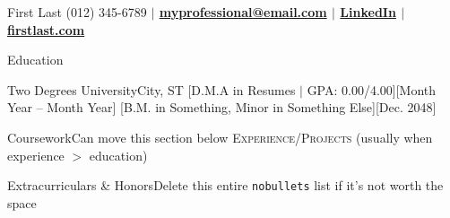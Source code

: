 \documentclass[9pt]{extarticle} %
\begin{document}
\lrHeader
{First Last}
{(012) 345-6789 \textbf{
        $\vert$ \href{mailto:myprofessional@email.com}{myprofessional@email.com}
        $\vert$ \href{https://www.linkedin.com/in/firstlast/}{LinkedIn}
        $\vert$ \href{https://www.youtube.com/watch?v=dQw4w9WgXcQ}{firstlast.com}}}

\begin{sectionList}{Education}
    \item \lr
    {Two Degrees University}{City, ST}
    [D.M.A in Resumes $\vert$ GPA: 0.00/4.00][Month Year -- Month Year]
    [B.M. in Something, Minor in Something Else][Dec. 2048]
    \begin{nobullets}
        \item {}
        {Coursework}{Can move this section below \textsc{Experience/Projects} (usually when experience $>$ education)}
        \item {}
        {Extracurriculars \& Honors}{Delete this entire \texttt{nobullets} list if it's not worth the space}
    \end{nobullets}
\end{sectionList}
\end{document}
